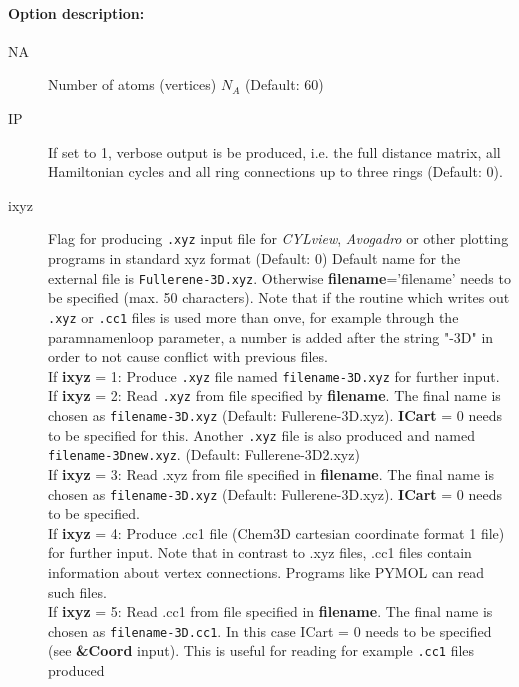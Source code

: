 \documentclass[article,a4paper,twoside]{memoir}
\newcommand{\program}[1]{\textit{#1}}
\newcommand{\filename}[1]{\texttt{#1}}
\newcommand{\paramname}[1]{{\color{green}\textbf{#1}}}
\begin{document}
\paragraph{Option description:}
\begin{description}
\item[{NA}]   Number of atoms (vertices) $N_A$ (Default: 60)
\item[{IP}]  If set to 1, verbose output is be produced, i.e. the full distance matrix, all Hamiltonian cycles 
  and all ring connections up to three rings (Default: 0).
\item[{ixyz}] Flag for producing \filename{.xyz} input file for \program{CYLview}, \program{Avogadro} or other plotting programs in standard xyz format (Default: 0)
  Default name for the external file is \filename{Fullerene-3D.xyz}. Otherwise \paramname{filename}='filename' needs to be specified (max. 50 characters).
  Note that if the routine which writes out \filename{.xyz} or \filename{.cc1} files is used more than onve, for example through the paramname{nloop} parameter,
  a number is added after the string "-3D" in order to not cause conflict with previous files.\\
  If \paramname{ixyz} = 1: Produce \filename{.xyz} file named \filename{filename-3D.xyz} for further input.\\
  If \paramname{ixyz} = 2: Read \filename{.xyz} from file specified by \paramname{filename}. The final name is chosen as \filename{filename-3D.xyz} (Default: Fullerene-3D.xyz). 
  \paramname{ICart} = 0 needs to be specified for this. Another \filename{.xyz} file is also produced and named   \filename{filename-3Dnew.xyz}. (Default: Fullerene-3D2.xyz)\\
  If \paramname{ixyz} = 3: Read .xyz from file specified in \paramname{filename}. The final name is chosen as \filename{filename-3D.xyz} (Default: Fullerene-3D.xyz). 
  \paramname{ICart} = 0  needs to be specified.\\
  If \paramname{ixyz} = 4: Produce .cc1 file (Chem3D cartesian coordinate format 1 file) for further input. Note that in contrast to .xyz files,
  .cc1 files contain information about vertex connections. Programs like PYMOL can read such files.\\
  If \paramname{ixyz} = 5: Read .cc1 from file specified in \paramname{filename}. The final name is chosen as \filename{filename-3D.cc1}. 
  In this case ICart = 0  needs to be specified (see \paramname{\&Coord} input). This is useful for reading for example \filename{.cc1} files produced 

\end{description}
\end{document}
